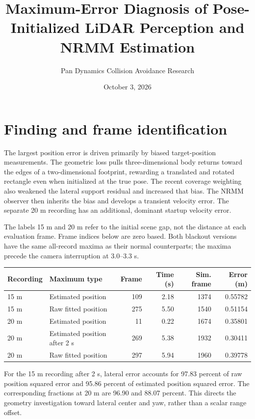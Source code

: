 \documentclass[11pt]{article}
\title{Maximum-Error Diagnosis of Pose-Initialized LiDAR Perception and NRMM Estimation}
\author{Pan Dynamics Collision Avoidance Research}
\date{October 3, 2026}
\begin{document}
\maketitle

\section{Finding and frame identification}
The largest position error is driven primarily by biased target-position
measurements. The geometric loss pulls three-dimensional body returns toward
the edges of a two-dimensional footprint, rewarding a translated and rotated
rectangle even when initialized at the true pose. The recent coverage weighting
also weakened the lateral support residual and increased that bias. The NRMM
observer then inherits the bias and develops a transient velocity error.
The separate 20 m recording has an additional, dominant startup velocity error.

The labels 15 m and 20 m refer to the initial scene gap, not the distance at
each evaluation frame. Frame indices below are zero based. Both blackout
versions have the same all-record maxima as their normal counterparts; the
maxima precede the camera interruption at 3.0--3.3 s.

\begin{center}\small
\begin{tabular}{@{}llrrrr@{}}\toprule
Recording & Maximum type & Frame & Time (s) & Sim. frame & Error (m) \\\midrule
15 m & Estimated position & 109 & 2.18 & 1374 & 0.55782 \\
15 m & Raw fitted position & 275 & 5.50 & 1540 & 0.51154 \\
20 m & Estimated position & 11 & 0.22 & 1674 & 0.35801 \\
20 m & Estimated position after 2 s & 269 & 5.38 & 1932 & 0.30411 \\
20 m & Raw fitted position & 297 & 5.94 & 1960 & 0.39778 \\
\bottomrule\end{tabular}
\end{center}

For the 15 m recording after 2 s, lateral error accounts for 97.83 percent
of raw position squared error and 95.86 percent of estimated position squared
error. The corresponding fractions at 20 m are 96.90 and 88.07 percent.
This directs the geometry investigation toward lateral center and yaw, rather
than a scalar range offset.
\end{document}
